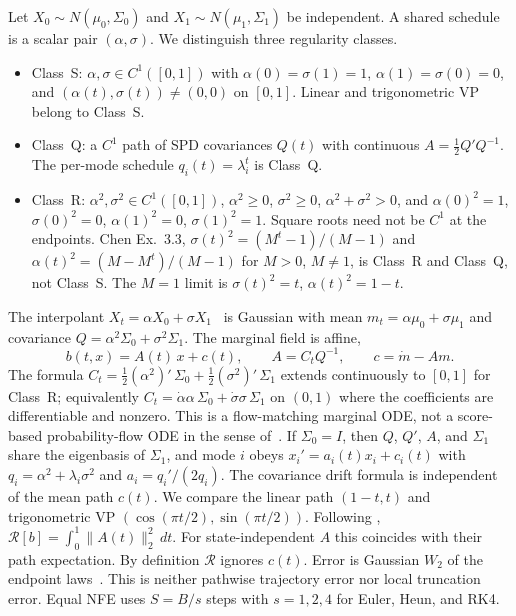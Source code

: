 \documentclass{article}
\newcommand{\wtwo}{W_2}
\newcommand{\cR}{\mathcal{R}}
\begin{document}
Let $X_0\sim N(\mu_0,\Sigma_0)$ and $X_1\sim N(\mu_1,\Sigma_1)$ be
independent. A shared schedule is a scalar pair $(\alpha,\sigma)$. We
distinguish three regularity classes.
\begin{itemize}[leftmargin=1.1em,itemsep=2pt]
\item Class~S: $\alpha,\sigma\in C^1([0,1])$ with
  $\alpha(0)=\sigma(1)=1$, $\alpha(1)=\sigma(0)=0$, and
  $(\alpha(t),\sigma(t))\neq(0,0)$ on $[0,1]$. Linear and
  trigonometric VP belong to Class~S.
\item Class~Q: a $C^1$ path of SPD covariances $Q(t)$ with continuous
  $A=\tfrac12 Q'Q^{-1}$. The per-mode schedule $q_i(t)=\lambda_i^t$ is
  Class~Q.
\item Class~R: $\alpha^2,\sigma^2\in C^1([0,1])$, $\alpha^2\ge 0$,
  $\sigma^2\ge 0$, $\alpha^2+\sigma^2>0$, and
  $\alpha(0)^2=1$, $\sigma(0)^2=0$, $\alpha(1)^2=0$, $\sigma(1)^2=1$.
  Square roots need not be $C^1$ at the endpoints. Chen Ex.~3.3,
  $\sigma(t)^2=(M^t-1)/(M-1)$ and $\alpha(t)^2=(M-M^t)/(M-1)$ for
  $M>0$, $M\neq 1$, is Class~R and Class~Q, not Class~S. The $M=1$
  limit is $\sigma(t)^2=t$, $\alpha(t)^2=1-t$.
\end{itemize}
The interpolant $X_t=\alpha X_0+\sigma X_1$~\citep{albergo2025stochastic,lipman2023flow}
is Gaussian with mean $m_t=\alpha\mu_0+\sigma\mu_1$ and covariance
$Q=\alpha^2\Sigma_0+\sigma^2\Sigma_1$. The marginal field is affine,
\begin{equation}
  b(t,x)=A(t)\,x+c(t),\qquad
  A=C_t Q^{-1},\qquad
  c=\dot m-Am.
\end{equation}
The formula
$C_t=\tfrac12(\alpha^2)'\,\Sigma_0+\tfrac12(\sigma^2)'\,\Sigma_1$
extends continuously to $[0,1]$ for Class~R; equivalently
$C_t=\dot\alpha\alpha\,\Sigma_0+\dot\sigma\sigma\,\Sigma_1$ on $(0,1)$
where the coefficients are differentiable and nonzero. This is a flow-matching
marginal ODE, not a score-based probability-flow ODE in the sense
of~\citet{song2021score}. If $\Sigma_0=I$, then $Q$, $Q'$, $A$, and
$\Sigma_1$ share the eigenbasis of $\Sigma_1$, and mode $i$ obeys
$x_i'=a_i(t)x_i+c_i(t)$ with $q_i=\alpha^2+\lambda_i\sigma^2$ and
$a_i=q_i'/(2q_i)$. The covariance drift formula is independent of the
mean path $c(t)$. We compare the linear path $(1-t,t)$ and trigonometric
VP $(\cos(\pi t/2),\sin(\pi t/2))$. Following
\citet[Definition~3.2]{lipschitzguided2025},
$\cR[b]=\int_0^1\|A(t)\|_2^2\,dt$. For state-independent $A$ this
coincides with their path expectation. By definition $\cR$ ignores
$c(t)$. Error is Gaussian $\wtwo$ of the endpoint
laws~\citep{gelbrich1990formula}.
This is neither pathwise trajectory error nor local truncation error.
Equal NFE uses $S=B/s$ steps with $s=1,2,4$ for Euler, Heun, and RK4.
\end{document}
